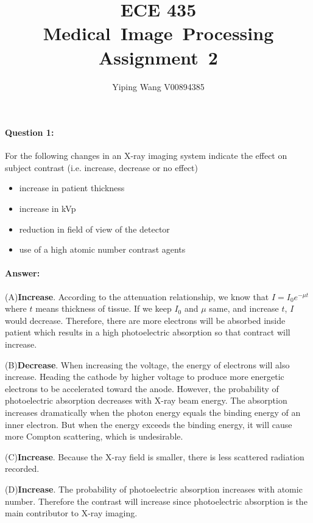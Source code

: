 \documentclass[12pt, letter]{article}
\newcommand{\courseName}{ECE 435 Medical~Image~Processing}
\newcommand{\assignName}{Assignment~2}
\begin{document}
\pagestyle{titlesec_assignment}

\title{\courseName\\\assignName}
\author{Yiping Wang V00894385}
\maketitle

\paragraph{Question 1: } For the following changes in an X-ray imaging system indicate the effect on subject contrast (i.e. increase, decrease or no effect)
\begin{itemize}
    \item increase in patient thickness
    \item increase in kVp
    \item reduction in field of view of the detector
    \item use of a high atomic number contrast agents
\end{itemize}
\paragraph{Answer: }

(A)\textbf{Increase}. According to the attenuation relationship, we know that $I = I_0e^{-\mu t}$ where $t$ means thickness of tissue. If we keep $I_0$ and $\mu$ same, and increase $t$, $I$ would decrease. Therefore, there are more electrons will be absorbed inside patient which results in a high photoelectric absorption so that contract will increase. 

(B)\textbf{Decrease}. When increasing the voltage, the energy of electrons will also increase. Heading the cathode by higher voltage to produce more energetic electrons to be accelerated toward the anode. However, the probability of photoelectric absorption decreases with X-ray beam energy. The absorption increases dramatically when the photon energy equals the binding energy of an inner electron. But when the energy exceeds the binding energy, it will cause more Compton scattering, which is undesirable. 

(C)\textbf{Increase}. Because the X-ray field is smaller, there is less scattered radiation recorded. 

(D)\textbf{Increase}. The probability of photoelectric absorption increases with atomic number. Therefore the contrast will increase since photoelectric absorption is the main contributor to X-ray imaging. 
\end{document}
